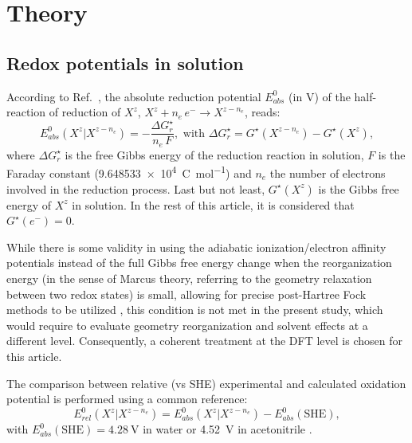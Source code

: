 \documentclass[review,preprint]{elsarticle}
\begin{document}
\clearpage
\section{Theory}\label{sec:theory}

\subsection{Redox potentials in solution}

According to Ref.~\cite{marenichComputationalElectrochemistryPrediction2014}, the absolute reduction potential $E_{abs}^0$ (in \si{\volt}) of the half-reaction of reduction of $X^z$, $X^{z} + n_e\,e^- \rightarrow X^{z-n_e}$, reads: \begin{equation}
	E_{abs}^0(X^{z}|X^{z-n_e}) = -\frac{\Delta G_{r}^\star}{n_e\,F}, \text{ with } \Delta G_{r}^\star = G^\star(X^{z-n_e}) - G^\star(X^z), \label{eq:nernst}
\end{equation}
where $\Delta G_{r}^\star$ is the free Gibbs energy of the reduction reaction in solution, $F$ is the Faraday constant (\SI{9.648533e4}{\coulomb\per\mole}) and $n_e$ the number of electrons involved in the reduction process. Last but not least, $G^\star(X^z)$ is the Gibbs free energy of $X^z$ in solution.  In the rest of this article, it is considered that $G^\star(e^-) = 0$.

While there is some validity in using the adiabatic ionization/electron affinity potentials instead of the full Gibbs free energy change when the reorganization energy (in the sense of Marcus theory, referring to the geometry relaxation between two redox states) is small, allowing for precise post-Hartree Fock methods to be utilized \cite{namazianBenchmarkCalculationsAbsolute2010,marenichComputationalElectrochemistryPrediction2014,makosModelingAbsoluteRedox2022}, this condition is not met in the present study, which would require to evaluate geometry reorganization and solvent effects at a different level. Consequently, a coherent treatment at the DFT level is chosen for this article.


The comparison between relative (vs SHE) experimental and calculated oxidation potential is performed using a common reference:\begin{equation}
	E^0_{rel}(X^z|X^{z-n_e})  = E^0_{abs}(X^z|X^{z-n_e}) - E^{0}_{abs}(\text{SHE}), \label{eq:ecalc}
\end{equation}
with $E^0_{abs}(\text{SHE}) = \SI{4.28}{\volt}$ in water or \SI{4.52}{\volt} in acetonitrile \cite{marenichComputationalElectrochemistryPrediction2014}.
\end{document}
